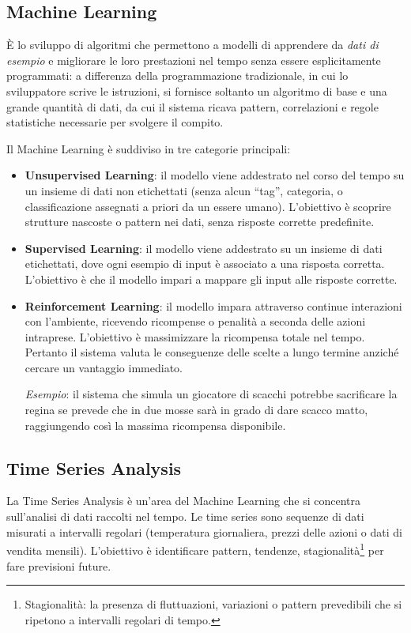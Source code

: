 \documentclass[a4paper, 11pt, oneside]{book}
\theoremstyle{definition}
\begin{document}
	\subsection{Machine Learning}
	\`E lo sviluppo di algoritmi che permettono a modelli di apprendere da \emph{dati
	di esempio} e migliorare le loro prestazioni nel tempo senza essere
	esplicitamente programmati: a differenza della programmazione tradizionale, in cui lo
	sviluppatore scrive le istruzioni, si fornisce soltanto un algoritmo di base e una
	grande quantit\`a di dati, da cui il sistema ricava pattern, correlazioni e regole
	statistiche necessarie per svolgere il compito.

	Il Machine Learning \`e suddiviso in tre categorie principali:
	\begin{itemize}
		\item \textbf{Unsupervised Learning}: il modello viene addestrato nel corso del
			tempo su un insieme di dati non etichettati (senza alcun ``tag'', categoria,
			o classificazione assegnati a priori da un essere umano). L'obiettivo \`e scoprire
			strutture nascoste o pattern nei dati, senza risposte corrette predefinite.

		\item \textbf{Supervised Learning}: il modello viene addestrato su un insieme
			di dati etichettati, dove ogni esempio di input \`e associato a una risposta
			corretta. L'obiettivo \`e che il modello impari a mappare gli input alle risposte
			corrette.

		\item \textbf{Reinforcement Learning}: il modello impara attraverso continue
			interazioni con l'ambiente, ricevendo ricompense o penalit\`a a seconda
			delle azioni intraprese. L'obiettivo \`e massimizzare la ricompensa totale
			nel tempo. Pertanto il sistema valuta le conseguenze delle scelte a lungo termine
			anzich\'e cercare un vantaggio immediato.

			\emph{Esempio}: il sistema che simula un giocatore di scacchi potrebbe sacrificare
			la regina se prevede che in due mosse sar\`a in grado di dare scacco matto,
			raggiungendo cos\`i la massima ricompensa disponibile.
	\end{itemize}

	\subsection{Time Series Analysis}
	La Time Series Analysis \`e un'area del Machine Learning che si
	concentra sull'analisi di dati raccolti nel tempo. Le time series sono
	sequenze di dati misurati a intervalli regolari (temperatura giornaliera,
	prezzi delle azioni o dati di vendita mensili). L'obiettivo \`e
	identificare pattern, tendenze, stagionalit\`a\footnote{Stagionalit\`a: la presenza
	di fluttuazioni, variazioni o pattern prevedibili che si ripetono a
	intervalli regolari di tempo.} per fare previsioni future.
\end{document}
